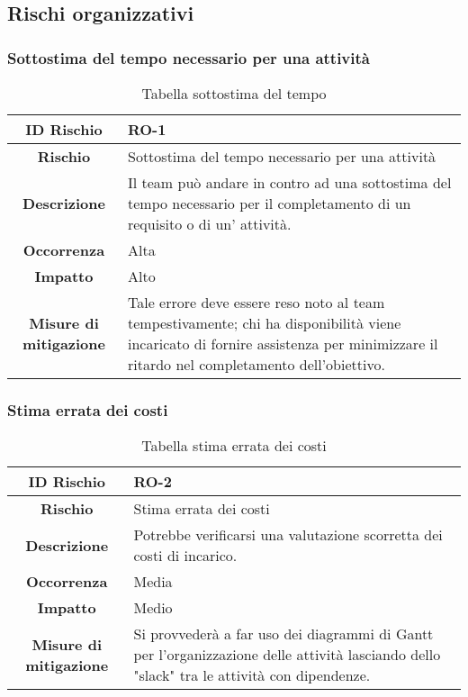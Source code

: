 \documentclass[10pt, a4paper]{article}
\begin{document}

\subsection{Rischi organizzativi}

\subsubsection{Sottostima del tempo necessario per una attività}

{\renewcommand{\arraystretch}{1.5}
\begin{table}[h]
\begin{tabularx}{\textwidth}{c|X}
\textbf{ID Rischio} & RO-1 \\
\hline
\textbf{Rischio} & Sottostima del tempo necessario per una attività\\
\hline
\textbf{Descrizione} & Il team può andare in contro ad una sottostima del tempo necessario per il completamento di un requisito o di un' attività.\\
\hline
\textbf{Occorrenza} & Alta\\
\hline
\textbf{Impatto} & Alto\\
\hline
\textbf{Misure di mitigazione} & Tale errore deve essere reso noto al team tempestivamente; chi ha disponibilità viene incaricato di fornire assistenza per minimizzare il ritardo nel completamento dell'obiettivo.\\
\end{tabularx}
\caption{Tabella sottostima del tempo}
\end{table}

\subsubsection{Stima errata dei costi}

{\renewcommand{\arraystretch}{1.5}
\begin{table}[H]
\begin{tabularx}{\textwidth}{c|X}
\textbf{ID Rischio} & RO-2 \\
\hline
\textbf{Rischio} & Stima errata dei costi \\
\hline
\textbf{Descrizione} & Potrebbe verificarsi una valutazione scorretta dei costi di incarico.\\
\hline
\textbf{Occorrenza} & Media\\
\hline
\textbf{Impatto} & Medio\\
\hline
\textbf{Misure di mitigazione} & Si provvederà a far uso dei diagrammi di Gantt per l'organizzazione delle attività lasciando dello "slack" tra le attività con dipendenze.\\
\end{tabularx}
\caption{Tabella stima errata dei costi}
\end{table}



}}
\end{document}

